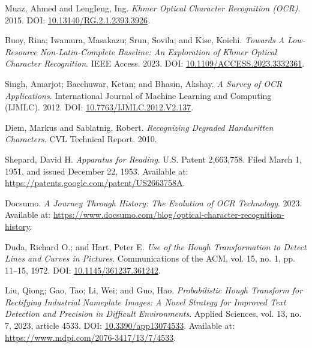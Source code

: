 







\label{ch:references} 


Muaz, Ahmed and LengIeng, Ing. 
\textit{Khmer Optical Character Recognition (OCR)}. 
2015. 
DOI: \href{https://doi.org/10.13140/RG.2.1.2393.3926}{10.13140/RG.2.1.2393.3926}.

Buoy, Rina; Iwamura, Masakazu; Srun, Sovila; and Kise, Koichi.
\textit{Towards A Low-Resource Non-Latin-Complete Baseline: An Exploration of Khmer Optical Character Recognition}.
IEEE Access.
2023.
DOI: \href{https://doi.org/10.1109/ACCESS.2023.3332361}{10.1109/ACCESS.2023.3332361}.

Singh, Amarjot; Bacchuwar, Ketan; and Bhasin, Akshay.
\textit{A Survey of OCR Applications}.
International Journal of Machine Learning and Computing (IJMLC).
2012.
DOI: \href{https://doi.org/10.7763/IJMLC.2012.V2.137}{10.7763/IJMLC.2012.V2.137}.

Diem, Markus and Sablatnig, Robert.
\textit{Recognizing Degraded Handwritten Characters}.
CVL Technical Report.
2010.

Shepard, David H.
\textit{Apparatus for Reading}.
U.S. Patent 2,663,758. Filed March 1, 1951, and issued December 22, 1953.
Available at: \href{https://patents.google.com/patent/US2663758A}{https://patents.google.com/patent/US2663758A}.

Docsumo.
\textit{A Journey Through History: The Evolution of OCR Technology}.
2023.
Available at: \href{https://www.docsumo.com/blog/optical-character-recognition-history}{https://www.docsumo.com/blog/optical-character-recognition-history}.

Duda, Richard O.; and Hart, Peter E.
\textit{Use of the Hough Transformation to Detect Lines and Curves in Pictures}.
Communications of the ACM, vol. 15, no. 1, pp. 11–15, 1972.
DOI: \href{https://doi.org/10.1145/361237.361242}{10.1145/361237.361242}.

Liu, Qiong; Gao, Tao; Li, Wei; and Guo, Hao.
\textit{Probabilistic Hough Transform for Rectifying Industrial Nameplate Images: A Novel Strategy for Improved Text Detection and Precision in Difficult Environments}.
Applied Sciences, vol. 13, no. 7, 2023, article 4533.
DOI: \href{https://doi.org/10.3390/app13074533}{10.3390/app13074533}.
Available at: \href{https://www.mdpi.com/2076-3417/13/7/4533}{https://www.mdpi.com/2076-3417/13/7/4533}.

